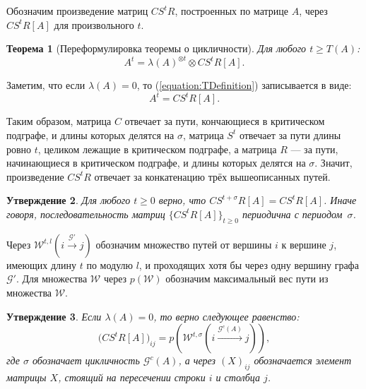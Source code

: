 \documentclass[12pt]{article}
\newtheorem{theorem}{Теорема}[section]
\newtheorem{proposition}[theorem]{Утверждение}
\theoremstyle{definition}
\begin{document}
Обозначим произведение матриц $CS^tR$, построенных по матрице $A$, через $CS^tR[A]$ для произвольного $t$.

\begin{theorem} [Переформулировка теоремы о цикличности] \cite[теорема 2.2]{15WeakCSRExpantion}
\label{theorem:CSRdecompositionTheorem}
Для любого $t \ge T(A)$:
\begin{equation}
\label{equation:TDefinition}
    A^t = \lambda(A)^{\otimes t} \otimes CS^tR[A].
\end{equation}
\end{theorem}

Заметим, что если $\lambda(A) = 0$, то (\ref{equation:TDefinition}) записывается в виде:
\begin{equation*}
    A^t = CS^tR[A].
\end{equation*}

Таким образом, матрица $C$ отвечает за пути, кончающиеся в критическом подграфе, и длины которых делятся на $\sigma$, матрица $S^t$ отвечает за пути длины ровно $t$, целиком лежащие в критическом подграфе, а матрица $R$ --- за пути, начинающиеся в критическом подграфе, и длины которых делятся на $\sigma$. Значит, произведение $CS^tR$ отвечает за конкатенацию трёх вышеописанных путей.

\begin{proposition} \cite[утверждение 3.2]{21CSRExpansionsOfMatrixPowersInMaxAlgebra}
\label{periodicity}
Для любого $t \ge 0$ верно, что 
$CS^{t+\sigma}R[A] = CS^tR[A]$. Иначе говоря, последовательность матриц $\{ CS^tR[A]\}_{t\ge0}$ периодична с периодом~$\sigma$.
\end{proposition}

Через $\mathcal{W}^{t, l}(i \xrightarrow{\mathcal{G}'} j)$ обозначим множество путей от вершины $i$ к вершине $j$, имеющих длину $t$ по модулю $l$, и проходящих хотя бы через одну вершину графа $\mathcal{G}'$. Для множества $\mathcal{W}$ через $p(\mathcal{W})$ обозначим максимальный вес пути из множества $\mathcal{W}$.

\begin{proposition} \cite[теорема 6.1]{15WeakCSRExpantion}
\label{entriesInCSR}
Если $\lambda(A) = 0$, то верно следующее равенство:
\begin{equation}
    \big(CS^tR[A]\big)_{ij} = p(\mathcal{W}^{t, \sigma}(i \xrightarrow{\mathcal{G}^c(A)} j)),
\end{equation}
где $\sigma$ обозначает цикличность $\mathcal{G}^c(A)$, а через $(X)_{ij}$ обозначается элемент матрицы $X$, стоящий на пересечении строки $i$ и столбца $j$.
\end{proposition}
\end{document}
